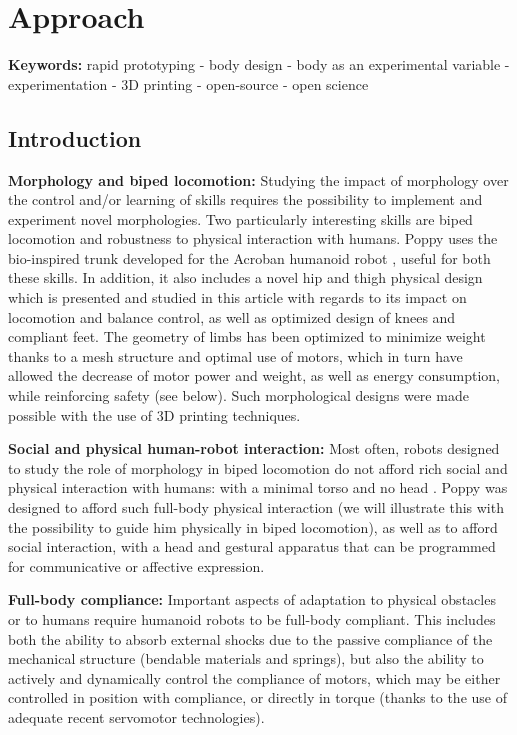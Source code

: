 
\chapter{Approach}

\textbf{Keywords:} rapid prototyping - body design - body as an experimental variable - experimentation - 3D printing - open-source - open science

\section{Introduction} %
\textbf{Morphology and biped locomotion:} Studying the impact of morphology over the control and/or learning of skills requires the possibility to implement and experiment novel morphologies. Two particularly interesting skills are biped locomotion and robustness to physical interaction with humans. Poppy uses the bio-inspired trunk developed for the Acroban humanoid robot \cite{Ly2011bio}, useful for both these skills. In addition, it also includes a novel hip and thigh physical design which is presented and studied in this article with regards to its impact on locomotion and balance control, as well as optimized design of knees and compliant feet. The geometry of limbs has been optimized to minimize weight thanks to a mesh structure and optimal use of motors, which in turn have allowed the decrease of motor power and weight, as well as energy consumption, while reinforcing safety (see below). Such morphological designs were made possible with the use of 3D printing techniques.

\textbf{Social and physical human-robot interaction:} Most often, robots designed to study the role of morphology in biped locomotion do not afford rich social and physical interaction with humans: with a minimal torso and no head \cite{collins2001three}\cite{niiyama2010athlete}. Poppy was designed to afford such full-body physical interaction (we will illustrate this with the possibility to guide him physically in biped locomotion), as well as to afford social interaction, with a head and gestural apparatus that can be programmed for communicative or affective expression.

\textbf{Full-body compliance:} Important aspects of adaptation to physical obstacles or to humans require humanoid robots to be full-body compliant. This includes both the ability to absorb external shocks due to the passive compliance of the mechanical structure (bendable materials and springs), but also the ability to actively and dynamically control the compliance of motors, which may be either controlled in position with compliance, or directly in torque (thanks to the use of adequate recent servomotor technologies).

